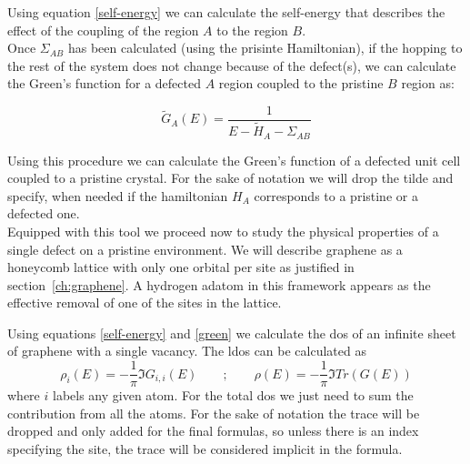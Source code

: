 Using equation \eqref{self-energy} we can calculate the self-energy that describes the effect of the coupling of the region $A$ to the region $B$.\\

Once $\Sigma_{AB}$ has been calculated (using the prisinte Hamiltonian), if the hopping to the rest of the system does not change because of the defect(s), we can calculate the Green's function for a defected $A$ region coupled to the pristine $B$ region as:

\begin{equation}
\widetilde{G}_A(E) = \frac{1}{E-\widetilde{H}_{A}-\Sigma_{AB}}
\label{green}
\end{equation}

Using this procedure we can calculate the Green's function of a defected unit cell coupled to a pristine crystal.
For the sake of notation we will drop the tilde and specify, when needed if the hamiltonian $H_A$ corresponds to a pristine or a defected one.\\


Equipped with this tool we proceed now to study the physical properties of a single defect on a pristine environment. We will describe graphene as a honeycomb lattice with only one orbital per site as justified in section~\ref{ch:graphene}. A hydrogen adatom in this framework appears as the effective removal of one of the sites in the lattice.

Using equations \eqref{self-energy} and \eqref{green} we calculate the \ac{dos} of an infinite sheet of graphene with a single vacancy. The \ac{ldos} can be calculated as
\begin{equation}
\rho_{i}(E) = -\frac{1}{\pi}\Im{G_{i,i}(E)} \quad\quad;\quad\quad
\rho(E) = -\frac{1}{\pi}\Im{Tr\left(G(E)\right)}
\label{eq:DOS}
\end{equation}
where $i$ labels any given atom. For the total \ac{dos} we just need to sum the contribution from all the atoms. For the sake of notation the trace will be dropped and only added for the final formulas, so unless there is an index specifying the site, the trace will be considered implicit in the formula.

